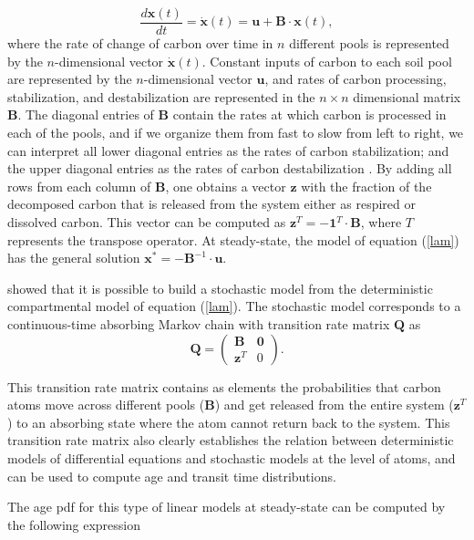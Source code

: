 \documentclass[draft,linenumbers]{agujournal}
\begin{document}
\begin{equation} \label{lam}
\frac{d \bm{x}(t)}{dt} = \dot{\bm{x}}(t) = \bm{u} + \mathbf{B} \cdot \bm{x}(t),
\end{equation}
where the rate of change of carbon over time in $n$ different pools is represented by the $n$-dimensional vector $\dot{\bm{x}}(t)$. Constant inputs of carbon to each soil pool are represented by the $n$-dimensional vector $\bm{u}$, and rates of carbon processing, stabilization, and destabilization are represented in the $n \times n$ dimensional matrix $\mathbf{B}$. The diagonal entries of $\mathbf{B}$ contain the rates at which carbon is processed in each of the pools, and if we organize them from fast to slow from left to right, we can interpret all lower diagonal entries as the rates of carbon stabilization; and the upper diagonal entries as the rates of carbon destabilization \citep{Sierra2015EM, Sierra2011EM}. By adding all rows from each column of $\mathbf{B}$, one obtains a vector $\bm{z}$ with the fraction of the decomposed carbon that is released from the system either as respired or dissolved carbon. This vector can be computed as $\bm{z}^T = - \mathbf{1}^{T} \cdot \mathbf{B}$, where $T$ represents the transpose operator.  At steady-state, the model of equation (\ref{lam}) has the general solution ${\bm x}^{\ast} = - \mathbf{B}^{-1} \cdot {\bm u}$.

\citet{Metzler2018MG} showed that it is possible to build a stochastic model from the deterministic compartmental model of equation (\ref{lam}). The stochastic model corresponds to a continuous-time absorbing Markov chain with transition rate matrix $\mathbf{Q}$ as
\begin{equation} \label{Q}
\mathbf{Q}=\begin{pmatrix} \mathbf{B} & \mathbf{0} \\ \bm{z}^T  & 0 \end{pmatrix}.
\end{equation}

This transition rate matrix contains as elements the probabilities that carbon atoms move across different pools ($\mathbf{B}$) and get released from the entire system ($\bm{z}^{T}$) to an absorbing state where the atom cannot return back to the system. This transition rate matrix also clearly establishes the relation between deterministic models of differential equations and stochastic models at the level of atoms, and can be used to compute age and transit time distributions. 

The age pdf for this type of linear models at steady-state can be computed by the following expression \citep{Metzler2018MG}
\end{document}
